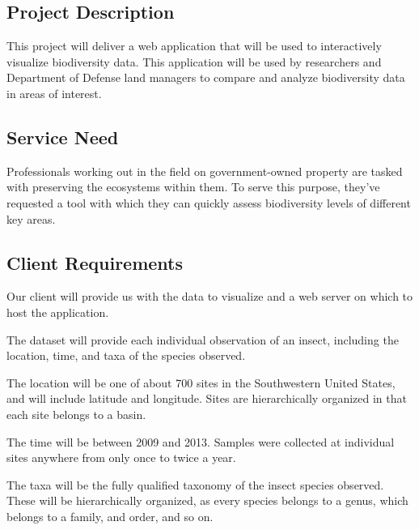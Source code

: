 \subsection{Project Description}

\par This project will deliver a web application that will be used to interactively visualize biodiversity data.
This application will be used by researchers and Department of Defense land managers to compare and analyze biodiversity data in areas of interest.

\subsection{Service Need}

\par Professionals working out in the field on government-owned property are tasked with preserving the ecosystems within them.
To serve this purpose, they’ve requested a tool with which they can quickly assess biodiversity levels of different key areas.

\subsection{Client Requirements}

\par Our client will provide us with the data to visualize and a web server on which to host the application.
\begin{list}{-}{}
\item The dataset will provide each individual observation of an insect, including the location, time, and taxa of the species observed.
\begin{list}{-}{}
\item The location will be one of about 700 sites in the Southwestern United States, and will include latitude and longitude.
Sites are hierarchically organized in that each site belongs to a basin.
\item The time will be between 2009 and 2013.
Samples were collected at individual sites anywhere from only once to twice a year.
\item The taxa will be the fully qualified taxonomy of the insect species observed.
These will be hierarchically organized, as every species belongs to a genus, which belongs to a family, and order, and so on.
\end{list}
\end{list}

